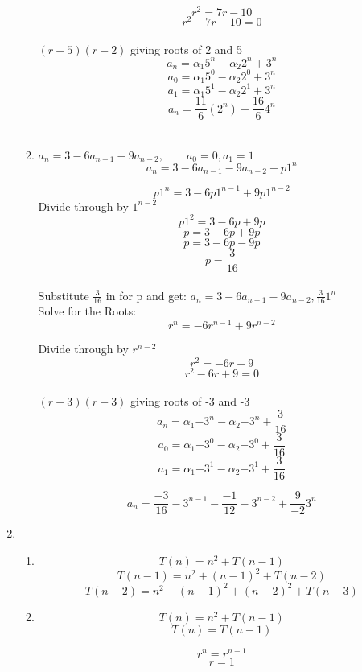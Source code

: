 \documentclass[12pt]{amsart}
\newcommand{\fr}[2]{\frac{#1}{#2}}
\begin{document}
\begin{enumerate}
\begin{enumerate}
$$ r^2 = 7r - 10$$
$$ r^2 - 7r - 10 = 0$$\\
$ (r - 5)(r - 2) $ giving roots of 2 and 5\\
$$ a_n = \alpha_1{5^n} - \alpha_2{2^n} + 3^n$$
$$ a_0 = \alpha_1{5^0} - \alpha_2{2^0} + 3^n$$
$$ a_1 = \alpha_1{5^1} - \alpha_2{2^1} + 3^n$$
$$ a_n = \fr{11}{6}({2^n}) - \fr{16}{6}{4^n}$$
\\

\item
$a_n = 3 - 6a_{n-1} - 9a_{n-2}, \qquad a_0 = 0, a_1 = 1$
$$a_n = 3 - 6a_{n-1} - 9a_{n-2} + p1^n$$

$$p1^n = 3 - 6p1^{n-1} + 9p1^{n-2}$$
Divide through by $1^{n-2}$
$$p1^2 = 3 - 6p + 9p$$
$$p = 3 - 6p + 9p$$
$$p = 3 -  6p - 9p$$
$$p = \fr{3}{16}$$\\





Substitute $\fr{3}{16}$ in for p and get:
$a_n = 3 - 6a_{n-1} - 9a_{n-2}, \fr{3}{16}1^n$
\\Solve for the Roots:\\
$$ r^n = - 6r^{n-1} + 9r^{n-2}$$

Divide through by $r^{n-2}$\\

$$ r^2 = - 6r + 9$$
$$ r^2 - 6r + 9 = 0$$\\
$ (r - 3)(r - 3) $ giving roots of -3 and -3\\
$$ a_n = \alpha_1{-3^n} - \alpha_2{-3^n} + \fr{3}{16}$$
$$ a_0 = \alpha_1{-3^0} - \alpha_2{-3^0} + \fr{3}{16}$$
$$ a_1 = \alpha_1{-3^1} - \alpha_2{-3^1} + \fr{3}{16}$$

$$a_n = \fr{-3}{16}-3^{n-1} - \fr{-1}{12}-3^{n-2} + \fr{9}{-2}3^n$$

\end{enumerate}


\item

\begin{enumerate}
\item


$$T(n) = n^2 + T(n-1)$$
$$T(n-1) = n^2 + (n-1)^2 + T(n-2)$$
$$T(n-2) = n^2 + (n-1)^2 + (n-2)^2 + T(n-3)$$

\item
$$T(n) = n^2 + T(n-1)$$
$$T(n) = T(n-1)$$

$$r^n = r^{n-1}$$
$$r = 1$$


\end{enumerate}
\end{enumerate}
\end{document}
